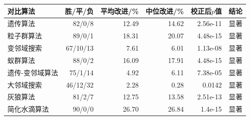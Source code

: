\begin{tabular}{lrrrrr}
\toprule
对比算法 & 胜/平/负 & 平均改进/\% & 中位改进/\% & 校正后$p$值 & 结论 \\
\midrule
遗传算法 & 82/0/8 & 12.49 & 14.62 & 2.56e-11 & 显著 \\
粒子群算法 & 89/0/1 & 18.31 & 20.07 & 4.48e-15 & 显著 \\
变邻域搜索 & 67/10/13 & 7.61 & 6.01 & 1.13e-08 & 显著 \\
蚁群算法 & 88/0/2 & 16.09 & 17.91 & 4.48e-15 & 显著 \\
遗传-变邻域算法 & 75/1/14 & 4.92 & 6.11 & 7.38e-05 & 显著 \\
大邻域搜索 & 46/12/32 & 2.28 & 0.28 & 0.0142 & 显著 \\
灰狼算法 & 81/2/7 & 12.75 & 13.58 & 2.51e-13 & 显著 \\
简化水滴算法 & 90/0/0 & 26.70 & 26.84 & 1.4e-15 & 显著 \\
\bottomrule
\end{tabular}
